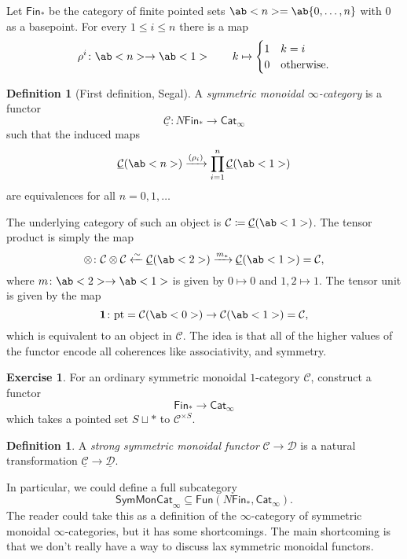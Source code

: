 \documentclass[10pt, oneside]{memoir}
\theoremstyle{definition}
\newtheorem{defn}[thm]{Definition}
\newtheorem{exer}[thm]{Exercise}
\theoremstyle{remark}
\theoremstyle{plain}
\theoremstyle{definition}
\theoremstyle{remark}
\newcommand{\mc}[1]{\mathcal{#1}}
\newcommand{\mr}[1]{\mathrm{#1}}
\newcommand{\ms}[1]{\mathsf{#1}}
\newcommand{\ul}[1]{\underline{#1}}
\newcommand{\1}{\mathbf{1}}
\newcommand{\2}{\mathbf{2}}
\newcommand{\3}{\mathbf{3}}
\newcommand{\pt}{\mr{pt}}
\begin{document}
Let $\ms{Fin}_*$ be the category of finite pointed sets $\ab<n> = \ab\{0, \ldots, n \}$ with $0$ as a basepoint. For every $1 \leq i \leq n$ there is a map
\[ \rho^i \colon \ab<n> \to \ab<1> \qquad k \mapsto \begin{cases}
    1 & k=i \\
    0 & \text{otherwise}.
\end{cases} \]

\begin{defn}[First definition, Segal]
    A \textit{symmetric monoidal $\infty$-category} is a functor
    \[ \ul{\mc{C}} \colon N \ms{Fin}_* \to \ms{Cat}_{\infty} \]
    such that the induced maps
    \[ \ul{\mc{C}}(\ab<n>) \xrightarrow{(\rho_i)} \prod_{i=1}^n \ul{\mc{C}}(\ab<1>) \]
    are equivalences for all $n = 0, 1, \ldots$
\end{defn}

The underlying category of such an object is $\mc{C} \coloneqq \ul{\mc{C}}(\ab<1>)$. The tensor product is simply the map
\[ \otimes \colon \mc{C} \otimes \mc{C} \xleftarrow{\sim} \ul{\mc{C}}(\ab<2>) \xrightarrow{m_*} \ul{\mc{C}}(\ab<1>)= \mc{C}, \]
where $m \colon \ab<2> \to \ab<1>$ is given by $0 \mapsto 0$ and $1,2 \mapsto 1$. The tensor unit is given by the map
\[ \1 \colon \pt = \mc{C}(\ab<0>) \to \mc{C}(\ab<1>) = \mc{C}, \]
which is equivalent to an object in $\mc{C}$. The idea is that all of the higher values of the functor encode all coherences like associativity, and symmetry.

\begin{exer}
    For an ordinary symmetric monoidal $1$-category $\mc{C}$, construct a functor
    \[ \ms{Fin}_* \to \ms{Cat}_{\infty} \]
    which takes a pointed set $S \sqcup *$ to $\mc{C}^{\times S}$.
\end{exer}

\begin{defn}
    A \textit{strong symmetric monoidal functor} $\mc{C} \to \mc{D}$ is a natural transformation $\ul{\mc{C}} \to \ul{\mc{D}}$.
\end{defn}

In particular, we could define a full subcategory
\[ \ms{SymMonCat}_{\infty} \subseteq \ms{Fun}(N\ms{Fin}_*, \ms{Cat}_{\infty}). \]
The reader could take this as a definition of the $\infty$-category of symmetric monoidal $\infty$-categories, but it has some shortcomings. The main shortcoming is that we don't really have a way to discuss lax symmetric monoidal functors.
\end{document}
